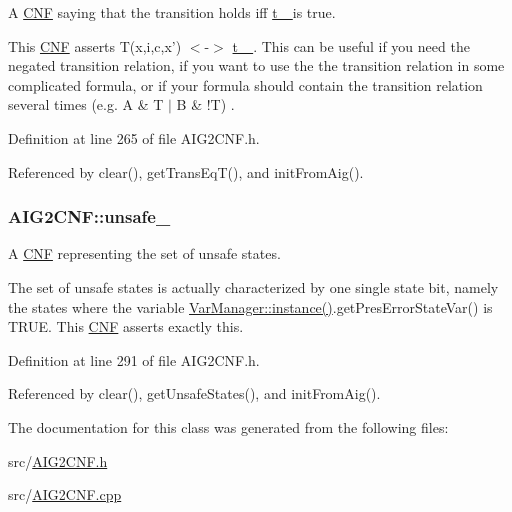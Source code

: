 A \hyperlink{classCNF}{C\-N\-F} saying that the transition holds iff \hyperlink{classAIG2CNF_af2a7f6ecdcec3b5b2f37a11b0adde65a}{t\-\_\- } is true. 

This \hyperlink{classCNF}{C\-N\-F} asserts T(x,i,c,x') $<$-\/$>$ \hyperlink{classAIG2CNF_af2a7f6ecdcec3b5b2f37a11b0adde65a}{t\-\_\- }. This can be useful if you need the negated transition relation, if you want to use the the transition relation in some complicated formula, or if your formula should contain the transition relation several times (e.\-g. A \& T $|$ B \& !\-T) . 

Definition at line 265 of file A\-I\-G2\-C\-N\-F.\-h.



Referenced by clear(), get\-Trans\-Eq\-T(), and init\-From\-Aig().

\hypertarget{classAIG2CNF_afbfcf3a27261a2283a99362d2527d64f}{
\subsubsection[{unsafe\-\_\-}]{ A\-I\-G2\-C\-N\-F\-::unsafe\-\_\-\hspace{0.3cm}{\ttfamily [protected]}}}\label{classAIG2CNF_afbfcf3a27261a2283a99362d2527d64f}


A \hyperlink{classCNF}{C\-N\-F} representing the set of unsafe states. 

The set of unsafe states is actually characterized by one single state bit, namely the states where the variable \hyperlink{classVarManager_ac1a84b367c26dfc5ee9e612f7d61b288}{Var\-Manager\-::instance()}.get\-Pres\-Error\-State\-Var() is T\-R\-U\-E. This \hyperlink{classCNF}{C\-N\-F} asserts exactly this. 

Definition at line 291 of file A\-I\-G2\-C\-N\-F.\-h.



Referenced by clear(), get\-Unsafe\-States(), and init\-From\-Aig().



The documentation for this class was generated from the following files\-:\begin{DoxyCompactItemize}
\item 
src/\hyperlink{AIG2CNF_8h}{A\-I\-G2\-C\-N\-F.\-h}\item 
src/\hyperlink{AIG2CNF_8cpp}{A\-I\-G2\-C\-N\-F.\-cpp}\end{DoxyCompactItemize}
